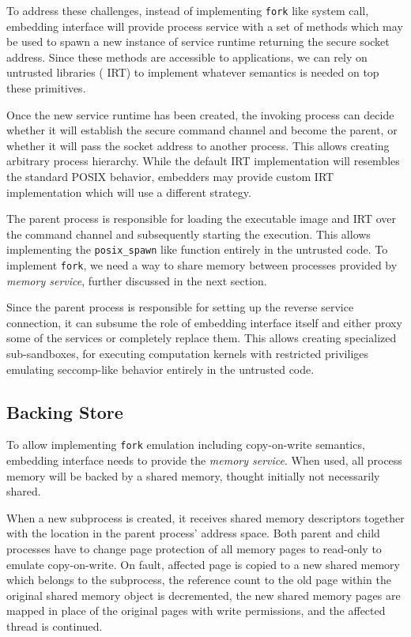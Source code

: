 To address these challenges, instead of implementing \lstinline`fork`
like system call, embedding interface will provide process service  with
a set of methods which may be used to spawn a new instance of
service runtime returning the secure socket address. Since these methods
are accessible to applications, we can rely on untrusted libraries (\eg
IRT) to implement whatever semantics is needed on top these primitives.

Once the new service runtime has been created, the invoking process can
decide whether it will establish the secure command channel and become
the parent, or whether it will pass the socket address to another
process.  This allows creating arbitrary process hierarchy.  While the
default IRT implementation will resembles the standard POSIX behavior,
embedders may provide custom IRT implementation which will use a
different strategy.

The parent process is responsible for loading the executable image and
IRT over the command channel and subsequently starting the execution.
This allows implementing the \lstinline`posix_spawn` like function
entirely in the untrusted code. To implement \lstinline`fork`, we need a
way to share memory between processes provided by \emph{memory service},
further discussed in the next section.

Since the parent process is responsible for setting up the reverse
service connection, it can subsume the role of embedding interface itself
and either proxy some of the services or completely replace them. This
allows creating specialized sub-sandboxes, \eg for executing computation
kernels with restricted priviliges emulating seccomp-like behavior
entirely in the untrusted code.

\subsection{Backing Store}
\label{sub:backing_store}


To allow implementing \lstinline`fork` emulation including copy-on-write
semantics, embedding interface needs to provide the \emph{memory
service}. When used, all process memory will be backed by a shared
memory, thought initially not necessarily shared.

When a new subprocess is created, it receives shared memory descriptors
together with the location in the parent process' address space. Both
parent and child processes have to change page protection of all memory
pages to read-only to emulate copy-on-write. On fault, affected page is
copied to a new shared memory which belongs to the subprocess, the
reference count to the old page within the original shared memory object
is decremented, the new shared memory pages are mapped in place of the
original pages with write permissions, and the affected thread is
continued.


